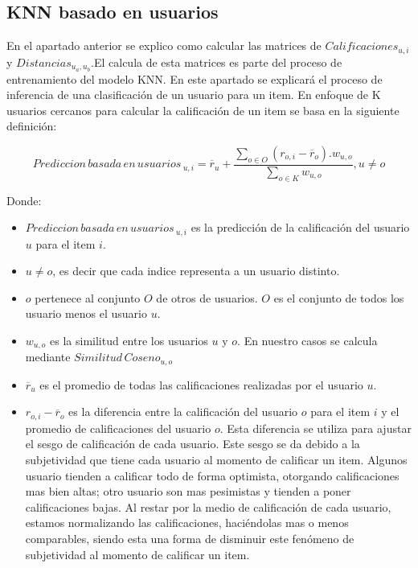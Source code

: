 \documentclass[11pt,a4paper,twoside]{thesis}
\begin{document}
\subsection{KNN basado en usuarios}

En el apartado anterior se explico como calcular las matrices de $Calificaciones_{u,i}$ y $Distancias_{u_a,u_b}$.El calcula de esta 
matrices es parte del proceso de entrenamiento del modelo KNN. En este apartado se explicará el proceso de inferencia de una 
clasificación de un usuario para un item. En enfoque de K usuarios cercanos para calcular la calificación de un item se basa en la siguiente definición:

\begin{equation*}
	Prediccion \mspace{3mu}basada \mspace{3mu}en \mspace{3mu}usuarios\mspace{3mu}_{u, i} = \overline{r}_{u} + \frac{\sum_{o \in O} (r_{o, i} - \overline{r}_o) . w_{u, o} }{ \sum_{o \in K} w_{u, o}}, u \neq o
\end{equation*}

\begin{description}
	\item[Donde:]
\end{description}
\begin{itemize}
	\item $Prediccion \mspace{3mu}basada \mspace{3mu}en \mspace{3mu}usuarios\mspace{3mu}_{u, i}$ es la predicción de la calificación del usuario $u$ para el item $i$.
	\item $u \neq o$, es decir que cada indice representa a un usuario distinto.
	\item $o$ pertenece al conjunto $O$ de otros de usuarios. $O$ es el conjunto de todos los usuario menos el usuario $u$.
	\item $w_{u,o}$ es la similitud entre los usuarios $u$ y $o$. En nuestro casos se calcula mediante $Similitud \mspace{3mu}Coseno_{u, o}$
	\item $\overline{r}_{u}$ es el promedio de todas las calificaciones realizadas por el usuario $u$.
 	\item $r_{o,i} - \overline{r}_{o}$ es la diferencia entre la calificación del usuario $o$ para el item $i$ y el promedio de calificaciones del usuario $o$. 
	 	Esta diferencia se utiliza para ajustar el sesgo de calificación de cada usuario. Este sesgo se da debido a la subjetividad que tiene cada usuario al 
		momento de calificar un item. Algunos usuario tienden a calificar todo de forma optimista, otorgando calificaciones mas bien altas; otro usuario son mas 
		pesimistas y tienden a poner calificaciones bajas. Al restar por la medio de calificación de cada usuario, estamos normalizando las calificaciones, haciéndolas mas o menos comparables, siendo esta una forma de disminuir este fenómeno de subjetividad al momento de calificar un item.
\end{itemize}
\end{document}
